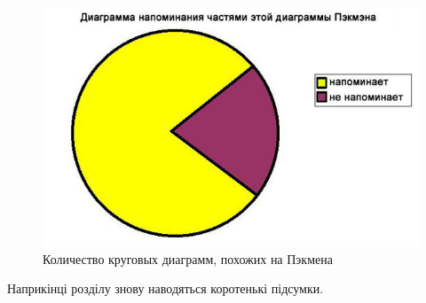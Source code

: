 \begin{figure}[ht]
        \centering
        \includegraphics[scale=0.5]{Images/Pacman.jpg}
        \caption{Количество круговых диаграмм, похожих на Пэкмена}
        \label{fig_pacman}
\end{figure}


\chapconclude{\ref{chap:theory}}

Наприкінці розділу знову наводяться коротенькі підсумки.
